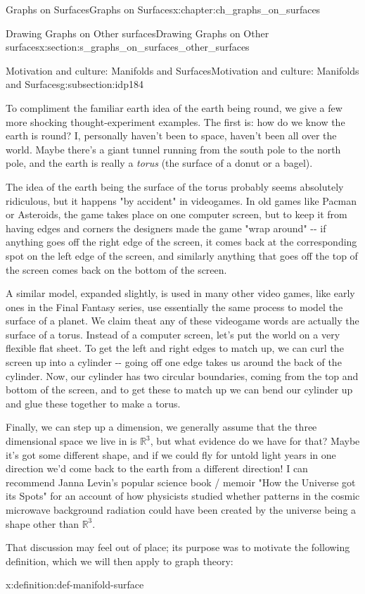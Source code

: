 \documentclass[oneside,10pt,]{book}
\numberwithin{equation}{section}
\newcommand{\reals}{\mathbb{R}}
\begin{document}
\begin{chapterptx}{Graphs on Surfaces}{}{Graphs on Surfaces}{}{}{x:chapter:ch_graphs_on_surfaces}
\begin{sectionptx}{Drawing Graphs on Other surfaces}{}{Drawing Graphs on Other surfaces}{}{}{x:section:s_graphs_on_surfaces_other_surfaces}
\begin{subsectionptx}{Motivation and culture: Manifolds and Surfaces}{}{Motivation and culture: Manifolds and Surfaces}{}{}{g:subsection:idp184}
\par
To compliment the familiar earth idea of the earth being round, we give a few more shocking thought-experiment examples.  The first is: how do we know the earth is round?  I, personally haven't been to space, haven't been all over the world.  Maybe there's a giant tunnel running from the south pole to the north pole, and the earth is really a \emph{torus} (the surface of a donut or a bagel).%
\par
The idea of the earth being the surface of the torus probably seems absolutely ridiculous, but it happens "by accident" in videogames.  In old games like Pacman or Asteroids, the game takes place on one computer screen, but to keep it from having edges and corners the designers made the game "wrap around" -{}-{} if anything goes off the right edge of the screen, it comes back at the corresponding spot on the left edge of the screen, and similarly anything that goes off the top of the screen comes back on the bottom of the screen.%
\par
A similar model, expanded slightly, is used in many other video games, like early ones in the Final Fantasy series, use essentially the same process to model the surface of a planet.  We claim theat any of these videogame words are actually the surface of a torus.  Instead of a computer screen, let's put the world on a very flexible flat sheet.  To get the left and right edges to match up, we can curl the screen up into a cylinder -{}-{} going off one edge takes us around the back of the cylinder.  Now, our cylinder has two circular boundaries, coming from the top and bottom of the screen, and to get these to match up we can bend our cylinder up and glue these together to make a torus.%
\par
Finally, we can step up a dimension, we generally assume that the three dimensional space we live in is \(\reals^3\), but what evidence do we have for that?  Maybe it's got some different shape, and if we could fly for untold light years in one direction we'd come back to the earth from a different direction!  I can recommend Janna Levin's popular science book \slash{} memoir "How the Universe got its Spots" for an account of how physicists studied whether patterns in the cosmic microwave background radiation could have been created by the universe being a shape other than \(\reals^3\).%
\par
That discussion may feel out of place; its purpose was to motivate the following definition, which we will then apply to graph theory:%
\begin{definition}{}{x:definition:def-manifold-surface}%

\end{definition}
\end{subsectionptx}
\end{sectionptx}
\end{chapterptx}
\end{document}
